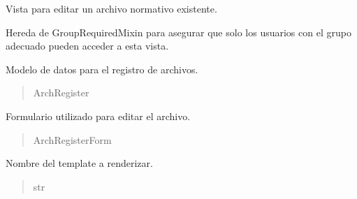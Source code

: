 \documentclass[letterpaper,10pt,spanish]{sphinxmanual}
\begin{document}
\begin{fulllineitems}

\pysigstartsignatures
{}
\pysigstopsignatures
\sphinxAtStartPar
Vista para editar un archivo normativo existente.

\sphinxAtStartPar
Hereda de GroupRequiredMixin para asegurar que solo los usuarios
con el grupo adecuado pueden acceder a esta vista.


\begin{fulllineitems}

\pysigstartsignatures
{}
\pysigstopsignatures
\sphinxAtStartPar
Modelo de datos para el registro de archivos.
\begin{quote}\begin{description}
\sphinxAtStartPar
ArchRegister

\end{description}\end{quote}

\end{fulllineitems}



\begin{fulllineitems}

\pysigstartsignatures
{}
\pysigstopsignatures
\sphinxAtStartPar
Formulario utilizado para editar el archivo.
\begin{quote}\begin{description}
\sphinxAtStartPar
ArchRegisterForm

\end{description}\end{quote}

\end{fulllineitems}



\begin{fulllineitems}

\pysigstartsignatures
{}
\pysigstopsignatures
\sphinxAtStartPar
Nombre del template a renderizar.
\begin{quote}\begin{description}
\sphinxAtStartPar
str


\end{description}
\end{quote}
\end{fulllineitems}
\end{fulllineitems}
\end{document}
